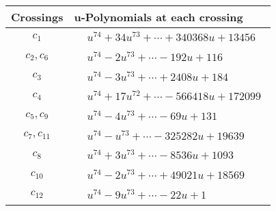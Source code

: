 \documentclass[1p]{elsarticle_modified}
\theoremstyle{definition}
\begin{document}
\begin{tabular}{m{50pt}|m{274pt}}
Crossings & \hspace{64pt}u-Polynomials at each crossing \\
\hline $$\begin{aligned}c_{1}\end{aligned}$$&$\begin{aligned}
&u^{74}+34 u^{73}+\cdots+340368 u+13456
\end{aligned}$\\
\hline $$\begin{aligned}c_{2},c_{6}\end{aligned}$$&$\begin{aligned}
&u^{74}-2 u^{73}+\cdots-192 u+116
\end{aligned}$\\
\hline $$\begin{aligned}c_{3}\end{aligned}$$&$\begin{aligned}
&u^{74}-3 u^{73}+\cdots+2408 u+184
\end{aligned}$\\
\hline $$\begin{aligned}c_{4}\end{aligned}$$&$\begin{aligned}
&u^{74}+17 u^{72}+\cdots-566418 u+172099
\end{aligned}$\\
\hline $$\begin{aligned}c_{5},c_{9}\end{aligned}$$&$\begin{aligned}
&u^{74}-4 u^{73}+\cdots-69 u+131
\end{aligned}$\\
\hline $$\begin{aligned}c_{7},c_{11}\end{aligned}$$&$\begin{aligned}
&u^{74}- u^{73}+\cdots-325282 u+19639
\end{aligned}$\\
\hline $$\begin{aligned}c_{8}\end{aligned}$$&$\begin{aligned}
&u^{74}+3 u^{73}+\cdots-8536 u+1093
\end{aligned}$\\
\hline $$\begin{aligned}c_{10}\end{aligned}$$&$\begin{aligned}
&u^{74}-2 u^{73}+\cdots+49021 u+18569
\end{aligned}$\\
\hline $$\begin{aligned}c_{12}\end{aligned}$$&$\begin{aligned}
&u^{74}-9 u^{73}+\cdots-22 u+1
\end{aligned}$\\
\hline
\end{tabular}\\~\\
\end{document}
